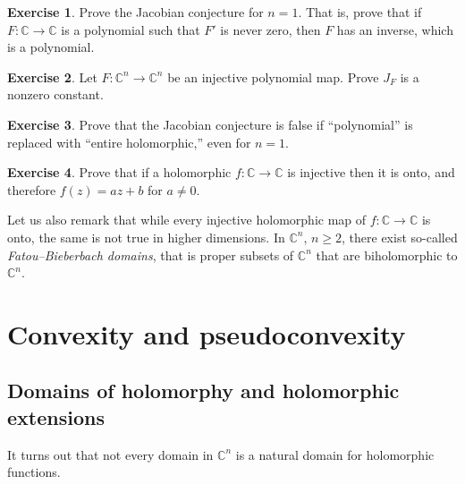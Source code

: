 \documentclass[12pt,openany]{book}
\newcommand{\C}{{\mathbb{C}}}
\theoremstyle{plain}
\theoremstyle{remark}
\theoremstyle{definition}
\newenvironment{exbox}{%
    \def\FrameCommand{\vrule width 1pt \relax\hspace {10pt}}%
    \MakeFramed {\advance \hsize -\width \FrameRestore }%
}{%
    \endMakeFramed
}
\theoremstyle{exercise}
\newtheorem{exercise}{Exercise}[section]
\theoremstyle{example}
\begin{document}
\begin{exbox}
\begin{exercise}
Prove the Jacobian conjecture for $n=1$.  That is, prove that if
$F \colon \C \to \C$ is a polynomial such that $F'$ is never zero,
then $F$ has an inverse, which is a polynomial.
\end{exercise}

\begin{exercise}
Let $F \colon \C^n \to \C^n$ be an injective polynomial map.
Prove $J_F$ is a nonzero constant.
\end{exercise}

\begin{exercise}
Prove that the Jacobian conjecture is false if
``polynomial'' is replaced with ``entire holomorphic,'' even for $n=1$.
\end{exercise}

\begin{exercise}
Prove that if a holomorphic $f \colon \C \to \C$ is injective then it is
onto, and therefore $f(z) = az + b$ for $a \not= 0$.
\end{exercise}
\end{exbox}

Let us also remark that while every injective holomorphic
map of $f \colon \C \to \C$ is onto, the same is not true in higher
dimensions.
In $\C^n$, $n \geq 2$, there exist so-called
\emph{Fatou--Bieberbach domains},
that is proper subsets of $\C^n$ that are biholomorphic to $\C^n$.



\chapter{Convexity and pseudoconvexity} \label{ch:convexity}


\section{Domains of holomorphy and holomorphic extensions}

It turns out that not every domain in $\C^n$ is a natural domain for
holomorphic functions.
\end{document}
